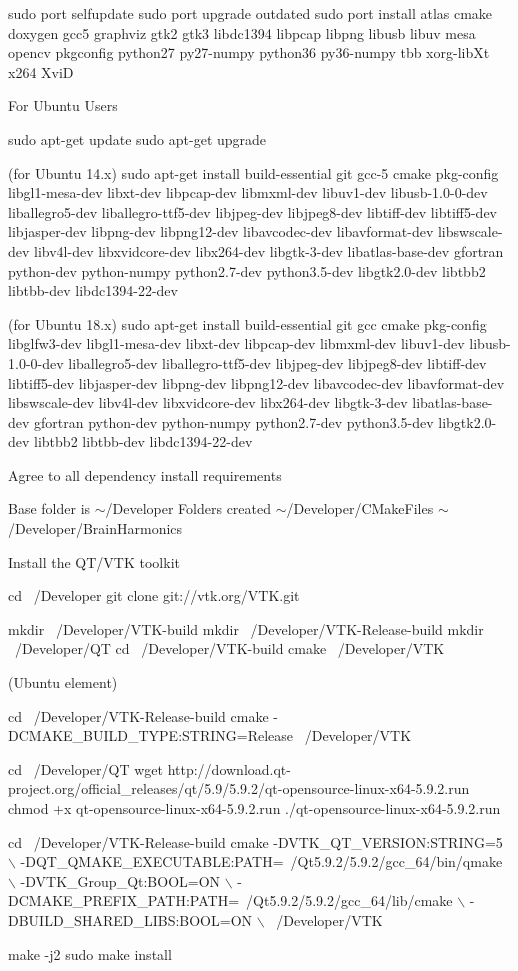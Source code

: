 \begin{DoxyCode}
sudo port selfupdate
sudo port upgrade outdated
sudo port install atlas cmake doxygen gcc5 graphviz gtk2 gtk3 libdc1394 libpcap libpng libusb libuv mesa
       opencv pkgconfig python27 py27-numpy python36 py36-numpy tbb xorg-libXt x264 XviD
\end{DoxyCode}
 For Ubuntu Users 
\begin{DoxyCode}
sudo apt-get update
sudo apt-get upgrade

(for Ubuntu 14.x)
sudo apt-get install build-essential git gcc-5 cmake pkg-config libgl1-mesa-dev libxt-dev libpcap-dev
       libmxml-dev libuv1-dev libusb-1.0-0-dev liballegro5-dev liballegro-ttf5-dev libjpeg-dev libjpeg8-dev libtiff-dev
       libtiff5-dev libjasper-dev libpng-dev libpng12-dev libavcodec-dev libavformat-dev libswscale-dev libv4l-dev
       libxvidcore-dev libx264-dev libgtk-3-dev libatlas-base-dev gfortran python-dev python-numpy python2.7-dev
       python3.5-dev libgtk2.0-dev libtbb2 libtbb-dev libdc1394-22-dev

(for Ubuntu 18.x)
sudo apt-get install build-essential git gcc cmake pkg-config libglfw3-dev libgl1-mesa-dev libxt-dev
       libpcap-dev libmxml-dev libuv1-dev libusb-1.0-0-dev liballegro5-dev liballegro-ttf5-dev libjpeg-dev libjpeg8-dev
       libtiff-dev libtiff5-dev libjasper-dev libpng-dev libpng12-dev libavcodec-dev libavformat-dev libswscale-dev
       libv4l-dev libxvidcore-dev libx264-dev libgtk-3-dev libatlas-base-dev gfortran python-dev python-numpy
       python2.7-dev python3.5-dev libgtk2.0-dev libtbb2 libtbb-dev libdc1394-22-dev
\end{DoxyCode}
 Agree to all dependency install requirements

Base folder is $\sim$/\+Developer Folders created $\sim$/\+Developer/\+C\+Make\+Files $\sim$/\+Developer/\+Brain\+Harmonics

Install the Q\+T/\+V\+TK toolkit


\begin{DoxyCode}
cd ~/Developer
git clone git://vtk.org/VTK.git

mkdir ~/Developer/VTK-build
mkdir ~/Developer/VTK-Release-build
mkdir ~/Developer/QT
cd ~/Developer/VTK-build
cmake ~/Developer/VTK
\end{DoxyCode}
 (Ubuntu element) 
\begin{DoxyCode}
cd ~/Developer/VTK-Release-build
cmake -DCMAKE\_BUILD\_TYPE:STRING=Release ~/Developer/VTK

cd ~/Developer/QT
wget http://download.qt-project.org/official\_releases/qt/5.9/5.9.2/qt-opensource-linux-x64-5.9.2.run
chmod +x qt-opensource-linux-x64-5.9.2.run
./qt-opensource-linux-x64-5.9.2.run

cd ~/Developer/VTK-Release-build
cmake -DVTK\_QT\_VERSION:STRING=5 \(\backslash\)
      -DQT\_QMAKE\_EXECUTABLE:PATH=~/Qt5.9.2/5.9.2/gcc\_64/bin/qmake \(\backslash\)
      -DVTK\_Group\_Qt:BOOL=ON \(\backslash\)
      -DCMAKE\_PREFIX\_PATH:PATH=~/Qt5.9.2/5.9.2/gcc\_64/lib/cmake  \(\backslash\)
      -DBUILD\_SHARED\_LIBS:BOOL=ON \(\backslash\)
      ~/Developer/VTK

make -j2
sudo make install
\end{DoxyCode}


